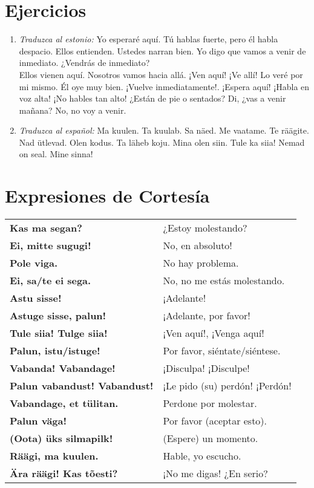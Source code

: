 \section*{\Large{Ejercicios}}

\begin{enumerate}
	\item \emph{Traduzca al estonio:} Yo esperaré aquí. Tú hablas fuerte, pero él habla despacio. Ellos entienden. Ustedes narran bien. Yo digo que vamos a venir de inmediato. ¿Vendrás de inmediato?\\

	Ellos vienen aquí. Nosotros vamos hacia allá. ¡Ven aquí! ¡Ve allí! Lo veré por mi mismo. Él oye muy bien. ¡Vuelve inmediatamente!. ¡Espera aquí! ¡Habla en voz alta! ¡No hables tan alto! ¿Están de pie o sentados? Di, ¿vas a venir mañana? No, no voy a venir.

	\item \emph{Traduzca al español:} Ma kuulen. Ta kuulab. Sa näed. Me vaatame. Te räägite. Nad ütlevad. Olen kodus. Ta läheb koju. Mina olen siin. Tule ka siia! Nemad on seal. Mine sinna!
\end{enumerate}

\section*{\Large{Expresiones de Cortesía}}

\begin{tabular}{ l l }
	\textbf{Kas ma segan?}				& ¿Estoy molestando? \\
	\textbf{Ei, mitte sugugi!}			& No, en absoluto! \\
	\textbf{Pole viga.}					& No hay problema. \\
	\textbf{Ei, sa/te ei sega.}			& No, no me estás molestando. \\
	\textbf{Astu sisse!}				& ¡Adelante! \\
	\textbf{Astuge sisse, palun!}		& ¡Adelante, por favor! \\
	\textbf{Tule siia! Tulge siia!}		& ¡Ven aquí!, ¡Venga aquí! \\
	\textbf{Palun, istu/istuge!}		& Por favor, siéntate/siéntese. \\
	\textbf{Vabanda! Vabandage!}		& ¡Disculpa! ¡Disculpe! \\
	\textbf{Palun vabandust! Vabandust!}& ¡Le pido (su) perdón! ¡Perdón! \\
	\textbf{Vabandage, et tülitan.}		& Perdone por molestar. \\
	\textbf{Palun väga!}				& Por favor (aceptar esto). \\
	\textbf{(Oota) üks silmapilk!}		& (Espere) un momento. \\
	\textbf{Räägi, ma kuulen.}			& Hable, yo escucho. \\
	\textbf{Ära räägi! Kas tõesti?}		& ¡No me digas! ¿En serio?
\end{tabular}

